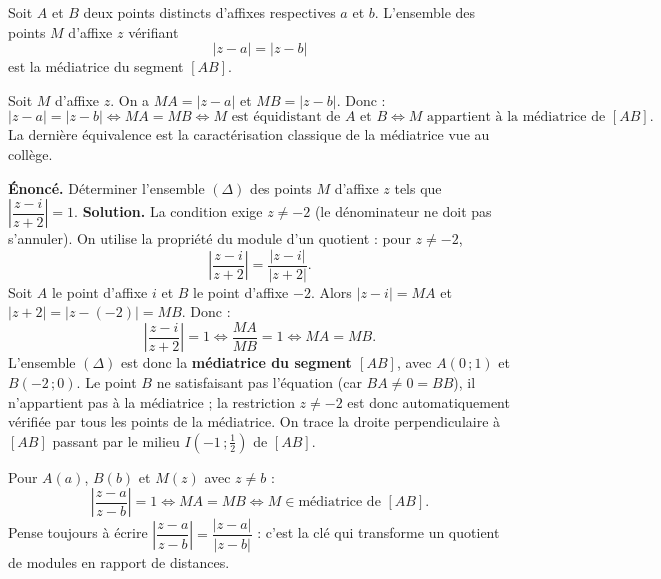 \documentclass[11pt]{article}
\newcommand{\cle}[1]{{\popxbold\color{popdark}#1}}
\begin{document}
\begin{propriete}
Soit $A$ et $B$ deux points distincts d'affixes respectives $a$ et $b$. L'ensemble des points $M$ d'affixe $z$ vérifiant
\[ |z - a| = |z - b| \]
est la \cle{médiatrice} du segment $[AB]$.
\end{propriete}

\begin{experience}
Soit $M$ d'affixe $z$. On a $MA = |z - a|$ et $MB = |z - b|$. Donc :
\[ |z - a| = |z - b| \iff MA = MB \iff M \text{ est équidistant de } A \text{ et } B \iff M \text{ appartient à la médiatrice de } [AB]. \]
La dernière équivalence est la caractérisation classique de la médiatrice vue au collège.
\end{experience}

\begin{exoresolu}
\textbf{Énoncé.} Déterminer l'ensemble $(\Delta)$ des points $M$ d'affixe $z$ tels que $\left|\dfrac{z - i}{z + 2}\right| = 1$.
\tcblower
\textbf{Solution.} La condition exige $z \neq -2$ (le dénominateur ne doit pas s'annuler). On utilise la propriété du module d'un quotient : pour $z \neq -2$,
\[ \left|\frac{z - i}{z + 2}\right| = \frac{|z - i|}{|z + 2|}. \]
Soit $A$ le point d'affixe $i$ et $B$ le point d'affixe $-2$. Alors $|z - i| = MA$ et $|z + 2| = |z - (-2)| = MB$. Donc :
\[ \left|\frac{z - i}{z + 2}\right| = 1 \iff \frac{MA}{MB} = 1 \iff MA = MB. \]
L'ensemble $(\Delta)$ est donc la \textbf{médiatrice du segment $[AB]$}, avec $A(0\,;1)$ et $B(-2\,;0)$. Le point $B$ ne satisfaisant pas l'équation (car $BA \neq 0 = BB$), il n'appartient pas à la médiatrice ; la restriction $z \neq -2$ est donc automatiquement vérifiée par tous les points de la médiatrice. On trace la droite perpendiculaire à $[AB]$ passant par le milieu $I(-1\,;\tfrac{1}{2})$ de $[AB]$.
\end{exoresolu}

\begin{aretenir}
Pour $A(a)$, $B(b)$ et $M(z)$ avec $z \neq b$ :
\[ \left|\frac{z - a}{z - b}\right| = 1 \iff MA = MB \iff M \in \text{médiatrice de } [AB]. \]
Pense toujours à écrire $\left|\dfrac{z-a}{z-b}\right| = \dfrac{|z-a|}{|z-b|}$ : c'est la clé qui transforme un quotient de modules en rapport de distances.
\end{aretenir}
\end{document}

